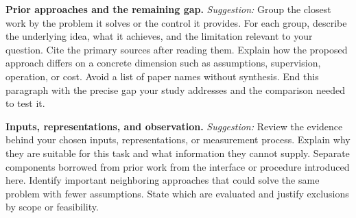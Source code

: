 \documentclass[]{spie}
\newcommand{\suggest}{\textit{Suggestion:} }
\begin{document}
\textbf{Prior approaches and the remaining gap.} \suggest Group the closest work by the problem it solves or the control it provides. For each group, describe the underlying idea, what it achieves, and the limitation relevant to your question. Cite the primary sources after reading them.\cite{slot02,slot03,slot04,slot05,slot06,slot07,slot08,slot09,slot10,slot11,slot12,slot13,slot14,slot15,slot16,slot17} Explain how the proposed approach differs on a concrete dimension such as assumptions, supervision, operation, or cost. Avoid a list of paper names without synthesis. End this paragraph with the precise gap your study addresses and the comparison needed to test it.

\textbf{Inputs, representations, and observation.} \suggest Review the evidence behind your chosen inputs, representations, or measurement process.\cite{slot18,slot19,slot20,slot21,slot22,slot23,slot24,slot25,slot26,slot27,slot28,slot29} Explain why they are suitable for this task and what information they cannot supply. Separate components borrowed from prior work from the interface or procedure introduced here. Identify important neighboring approaches that could solve the same problem with fewer assumptions. State which are evaluated and justify exclusions by scope or feasibility.
\end{document}
